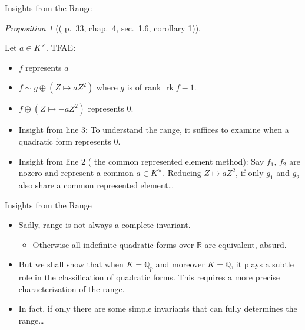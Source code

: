 \documentclass[fontset=fandol,envcountsect]{ctexbeamer}
\providecommand{\tightlist}{%
  \setlength{\itemsep}{0pt}\setlength{\parskip}{0pt}}\usepackage{longtable,booktabs,array}
\theoremstyle{theorem}
\newtheorem{proposition}{命题}
\theoremstyle{example}
\theoremstyle{remark}
\theoremstyle{theorem}
\newtheorem{proposition}{Proposition}
\theoremstyle{example}
\theoremstyle{remark}
\newcommand{\myemph}[1]{{\usebeamercolor[fg]{structure} #1}}
\renewcommand{\emph}{\myemph}
\begin{document}
\begin{frame}{Insights from the Range}
\label{insights-from-the-range}
\begin{proposition}[(\autocite{serre_course_1973} p.~33, chap.~4,
sec.~1.6, corollary
1)]\protect\hypertarget{prp-range}{}\label{prp-range}

Let \(a \in K^\times\). TFAE:

\begin{itemize}
\tightlist
\item
  \(f\) represents \(a\)
\item
  \(f \sim g \oplus (Z \mapsto a Z^2)\) where \(g\) is of rank
  \(\operatorname{rk}f - 1\).
\item
  \(f \oplus (Z \mapsto -a Z^2)\) represents \(0\).
\end{itemize}

\end{proposition}

\begin{itemize}
\tightlist
\item
  Insight from line 3: To understand the range, it suffices to examine
  when a quadratic form represents \(0\).
\item
  Insight from line 2 (\emph{the common represented element method}):
  Say \(f_1\), \(f_2\) are nozero and represent a common
  \(a \in K^\times\). Reducing \(Z \mapsto aZ^2\), if only \(g_1\) and
  \(g_2\) also share a common represented element\ldots{}
\end{itemize}
\end{frame}

\begin{frame}{Insights from the Range}
\label{insights-from-the-range-1}
\begin{itemize}
\item
  Sadly, range is not always a complete invariant.

  \begin{itemize}
  \tightlist
  \item
    Otherwise all indefinite quadratic forms over \(\mathbb R\) are
    equivalent, absurd.
  \end{itemize}
\item
  But we shall show that when \(K = \mathbb Q_p\) and moreover
  \(K = \mathbb Q\), it plays a subtle role in the classification of
  quadratic forms. This requires a more precise characterization of the
  range.
\item
  In fact, if only there are some simple invariants that can fully
  determines the range\ldots{}
\end{itemize}
\end{frame}
\end{document}
